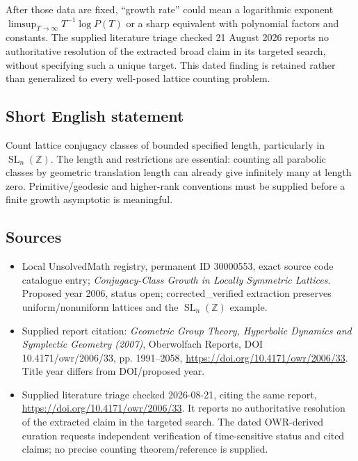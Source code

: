 \documentclass[11pt]{article}
\newcommand{\Z}{\mathbb{Z}}
\begin{document}
After those data are fixed, ``growth rate'' could mean a logarithmic exponent $\limsup_{T\to\infty}T^{-1}\log P(T)$ or a sharp equivalent with polynomial factors and constants. The supplied literature triage checked 21 August 2026 reports no authoritative resolution of the extracted broad claim in its targeted search, without specifying such a unique target. This dated finding is retained rather than generalized to every well-posed lattice counting problem.
\subsection{Short English statement}
Count lattice conjugacy classes of bounded specified length, particularly in $\operatorname{SL}_n(\Z)$. The length and restrictions are essential: counting all parabolic classes by geometric translation length can already give infinitely many at length zero. Primitive/geodesic and higher-rank conventions must be supplied before a finite growth asymptotic is meaningful.
\subsection{Sources}
\begin{itemize}
\item Local UnsolvedMath registry, permanent ID 30000553, exact source code catalogue entry; \emph{Conjugacy-Class Growth in Locally Symmetric Lattices}. Proposed year 2006, status open; corrected\_verified extraction preserves uniform/nonuniform lattices and the $\operatorname{SL}_n(\Z)$ example.
\item Supplied report citation: \emph{Geometric Group Theory, Hyperbolic Dynamics and Symplectic Geometry (2007)}, Oberwolfach Reports, DOI 10.4171/owr/2006/33, pp. 1991--2058, \url{https://doi.org/10.4171/owr/2006/33}. Title year differs from DOI/proposed year.
\item Supplied literature triage checked 2026-08-21, citing the same report, \url{https://doi.org/10.4171/owr/2006/33}. It reports no authoritative resolution of the extracted claim in the targeted search. The dated OWR-derived curation requests independent verification of time-sensitive status and cited claims; no precise counting theorem/reference is supplied.
\end{itemize}
\end{document}
